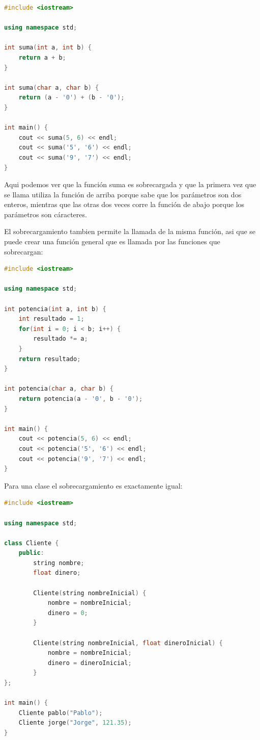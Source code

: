 \documentclass{article}
\begin{document}
\begin{lstlisting}[language=C++, caption=Sobrecargamiento]
#include <iostream>

using namespace std;

int suma(int a, int b) {
    return a + b;
}

int suma(char a, char b) {
    return (a - '0') + (b - '0');
}

int main() {
    cout << suma(5, 6) << endl;
    cout << suma('5', '6') << endl;
    cout << suma('9', '7') << endl;
}
\end{lstlisting}

Aqui podemos ver que la función suma es sobrecargada y que la primera vez que se llama utiliza la función de arriba porque sabe que los parámetros son dos enteros, mientras que las otras dos veces corre la función de abajo porque los parámetros son cáracteres.

El sobrecargamiento tambien permite la llamada de la misma función, asi que se puede crear una función general que es llamada por las funciones que sobrecargan:

\begin{lstlisting}[language=C++, caption=Sobrecargamiento]
#include <iostream>

using namespace std;

int potencia(int a, int b) {
    int resultado = 1;
    for(int i = 0; i < b; i++) {
        resultado *= a;
    }
    return resultado;
}

int potencia(char a, char b) {
    return potencia(a - '0', b - '0');
}

int main() {
    cout << potencia(5, 6) << endl;
    cout << potencia('5', '6') << endl;
    cout << potencia('9', '7') << endl;
}
\end{lstlisting}

Para una clase el sobrecargamiento es exactamente igual:

\begin{lstlisting}[language=C++, caption=Sobrecargamiento de clases]
#include <iostream>

using namespace std;

class Cliente {
    public:
        string nombre;
        float dinero;

        Cliente(string nombreInicial) {
            nombre = nombreInicial;
            dinero = 0;
        }

        Cliente(string nombreInicial, float dineroInicial) {
            nombre = nombreInicial;
            dinero = dineroInicial;
        }
};

int main() {
    Cliente pablo("Pablo");
    Cliente jorge("Jorge", 121.35);
}
\end{lstlisting}
\end{document}
